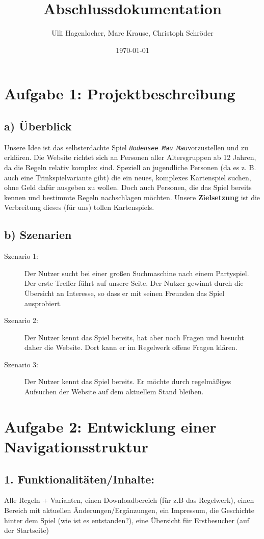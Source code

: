 \documentclass{scrartcl}
\title{Abschlussdokumentation}
\author{Ulli Hagenlocher, Marc Krause, Christoph Schröder}
\date{\today}
\newcommand{\BMM}{\texttt{\textit{Bodensee Mau Mau}}}
\begin{document}
 
\maketitle
\section*{Aufgabe 1: Projektbeschreibung}
\subsection*{a) Überblick}
Unsere Idee ist das selbsterdachte Spiel \BMM vorzustellen und zu erklären. Die Website richtet sich an Personen aller Altersgruppen ab 12 Jahren, da die Regeln relativ komplex sind. Speziell an jugendliche Personen (da es z. B. auch eine Trinkspielvariante gibt) die ein neues, komplexes Kartenspiel suchen, ohne Geld dafür ausgeben zu wollen. Doch auch Personen, die das Spiel bereits kennen und bestimmte Regeln nachschlagen möchten. Unsere \textbf{Zielsetzung} ist die Verbreitung dieses (für uns) tollen Kartenspiels.
\subsection*{b) Szenarien} 
\begin{description}
\item[Szenario 1:]
Der Nutzer sucht bei einer großen Suchmaschine nach einem Partyspiel. Der erste Treffer führt auf unsere Seite. Der Nutzer gewinnt durch die Übersicht an Interesse, so dass er mit seinen Freunden das Spiel ausprobiert.
\item[Szenario 2:]
Der Nutzer kennt das Spiel bereits, hat aber noch Fragen und besucht daher die Website. Dort kann er im Regelwerk offene Fragen klären.

\item[Szenario 3:]
Der Nutzer kennt das Spiel bereits. Er möchte durch regelmäßiges Aufsuchen der Website auf dem aktuellem Stand bleiben.
\end{description}

 \section*{Aufgabe 2: Entwicklung einer Navigationsstruktur} 
 \subsection*{1. Funktionalitäten/Inhalte:} 
 Alle Regeln + Varianten, einen Downloadbereich (für z.B das Regelwerk), einen Bereich mit aktuellen Änderungen/Ergänzungen, ein Impressum, die Geschichte hinter dem Spiel (wie ist es entstanden?), eine Übersicht für Erstbesucher (auf der Startseite)
\end{document}
